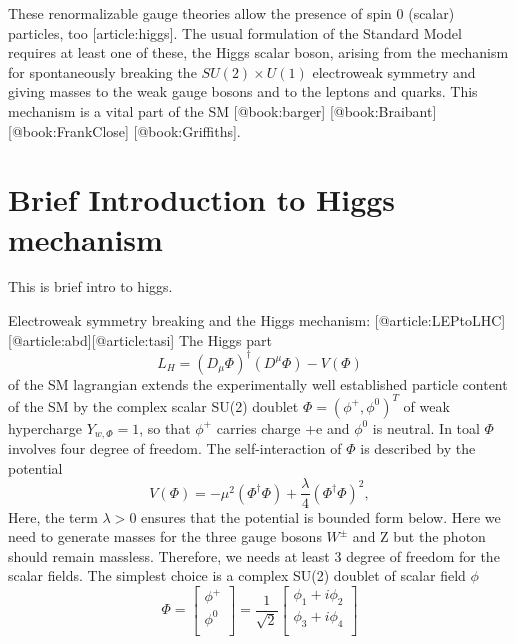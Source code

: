 These renormalizable gauge theories allow the presence of spin 0 (scalar) particles, too [article:higgs]. The usual formulation of the Standard Model requires at least one of these, the Higgs scalar boson, arising from the mechanism for spontaneously breaking the $SU(2)\times U(1)$ electroweak symmetry and giving masses to the weak gauge bosons and to the leptons and quarks. This mechanism is a vital part of the SM [@book:barger] [@book:Braibant] [@book:FrankClose] [@book:Griffiths].


\section{Brief Introduction to Higgs mechanism}
This is brief intro to higgs.

Electroweak symmetry breaking and the Higgs mechanism: [@article:LEPtoLHC] [@article:abd][@article:tasi]
The Higgs part
    \begin{equation}
    L_H=(D_{\mu}\Phi)^{\dagger}(D^{\mu}\Phi)-V(\Phi)
    \end{equation}
of the SM lagrangian extends the experimentally well established particle content of the SM by the complex scalar SU(2) doublet $\Phi = (\phi^{+},\phi^0)^T$ of weak hypercharge $Y_{w,\Phi}=1$, so that $\phi^{+}$ carries charge +e and $\phi^0$ is neutral. In toal $\Phi$ involves four degree of freedom. The self-interaction of $\Phi$ is described by the potential
    \begin{equation}
    V(\Phi)=-\mu^2(\Phi^{\dagger}\Phi)+\frac{\lambda}{4}(\Phi^{\dagger}\Phi)^2,
    \end{equation}
Here, the term $\lambda > 0$ ensures that the potential is bounded form below. Here we need to generate masses for the three gauge bosons $W^{\pm}$ and Z but the photon should remain massless. Therefore, we needs at least 3 degree of freedom for the scalar fields. The simplest choice is a complex SU(2) doublet of scalar field $\phi$
    \begin{equation}\label{mat2}
    \Phi=
        \begin{bmatrix}
        \phi^+  \\
        \phi^0  \\
        \end{bmatrix}
    =\frac{1}{\sqrt{2}}
        \begin{bmatrix}
        \phi_1 + i\phi_2    \\
        \phi_3 + i\phi_4    \\
        \end{bmatrix}
    \end{equation}
